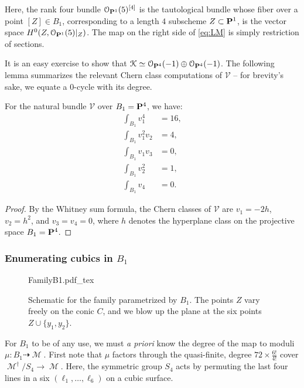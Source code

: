 \documentclass[12pt,reqno]{amsart}
\newcommand{\incfig}[1]{%
    \def\svgwidth{\columnwidth}
    {#1.pdf_tex}
}
\DeclareMathOperator{\M}{\mathcal{M}}
\renewcommand{\to}{{\longrightarrow}}
\numberwithin{equation}{section}
\renewcommand{\O}{\mathcal O}
\newcommand{\V}{\mathcal V}
\begin{document}
Here, the rank four bundle $\O_{\P^{1}}(5)^{[4]}$ is the tautological
bundle whose fiber over a point $[Z] \in B_{1}$, corresponding to a
length $4$ subscheme $Z \subset \P^{1}$, is the vector space
$H^{0}(Z, \O_{\P^{1}}(5)|_{Z})$.  The map on the right side of
\eqref{eq:LM} is simply restriction of sections.

It is an easy exercise to show that
$\mathcal{K} \simeq \O_{\P^{4}}(-1) \oplus \O_{\P^{4}}(-1)$.  The
following lemma summarizes the relevant Chern class computations of
$\V$ -- for brevity's sake, we equate a $0$-cycle with its degree.

\begin{lemma}
  \label{lemma:chernB1}
  For the natural bundle $\V$ over $B_1= \P^{4}$, we have:
  \begin{align}\nonumber
    \int_{B_{1}}v_{1}^{4} &= 16,\\\nonumber
    \int_{B_{1}}v_{1}^{2}v_{2} &= 4,\\\nonumber
    \int_{B_{1}}v_{1}v_{3} &=0,\\\nonumber
    \int_{B_{1}}v_2^{2} &= 1,\\\nonumber
    \int_{B_{1}}v_{4} &= 0.
  \end{align}
\end{lemma}

\begin{proof}
  By the Whitney sum formula, the Chern classes of $\V$ are
  $v_{1} = -2h$, $v_{2}=h^2$, and $v_{3}= v_{4}=0$, where $h$ denotes
  the hyperplane class on the projective space $B_1 = \P^{4}$.
\end{proof}









\subsubsection{Enumerating cubics in $B_1$}
\label{sec:enum-cubics-b_1}


\begin{figure}
  \centering
  \incfig{FamilyB1}
  \caption{Schematic for the family parametrized by $B_1$. The points
    $Z$ vary freely on the conic $C$, and we blow up the plane at the
    six points $Z \cup \{y_{1},y_{2}\}$.}
    \label{fig:FamilyB1}
\end{figure}


For $B_1$ to be of any use, we must {\sl a priori} know the degree of
the map to moduli $\mu: B_1 \dashrightarrow \M$.  First note that
$\mu$ factors through the quasi-finite, degree
$72 \times \frac{6!}{4!}$ cover $\M^{\dagger}/S_{4} \to \M$.  Here,
the symmetric group $S_4$ acts by permuting the last four lines in a
six $(\ell_{1}, \dots, \ell_{6})$ on a cubic surface.
\end{document}
